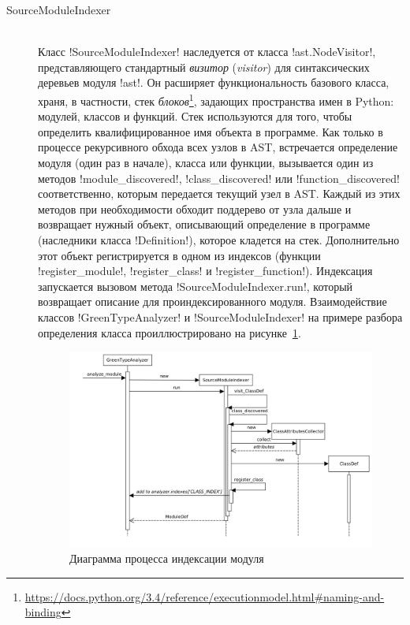 \begin{description}
  \item[SourceModuleIndexer] \hfill \\ 
    Класс !SourceModuleIndexer! наследуется от
    класса !ast.NodeVisitor!, представляющего стандартный
    \emph{визитор} (\emph{visitor}) для синтаксических деревьев модуля !ast!. Он
    расширяет функциональность базового класса, храня, в частности, стек
    \emph{блоков}\footnote{\url{https://docs.python.org/3.4/reference/executionmodel.html\#naming-and-binding}},
    задающих пространства имен в Python: модулей, классов и функций. Стек
    используются для того, чтобы определить квалифицированное имя
    объекта в программе.  Как только в процессе
    рекурсивного обхода всех узлов в AST, встречается определение модуля (один
    раз в начале), класса или функции, вызывается один из методов
    !module_discovered!, !class_discovered! или !function_discovered!
    соответственно, которым передается текущий узел в AST. Каждый из этих
    методов при необходимости обходит поддерево от узла дальше и возвращает
    нужный объект, описывающий определение в программе (наследники класса
    !Definition!), которое кладется на стек. Дополнительно этот объект
    регистрируется в одном из индексов
    (функции !register_module!, !register_class! и !register_function!).
    Индексация запускается вызовом метода !SourceModuleIndexer.run!, который
    возвращает описание для проиндексированного модуля. Взаимодействие классов
    !GreenTypeAnalyzer! и !SourceModuleIndexer! на примере разбора определения
    класса проиллюстрировано на рисунке~\ref{fig:indexing-diag}.

  \begin{figure}
  \begin{center}
      \includegraphics[width=\textwidth]{fig/indexing-diag.png}
  \end{center}
  \caption{Диаграмма процесса индексации модуля}
  \label{fig:indexing-diag}
  \end{figure}


\end{description}
